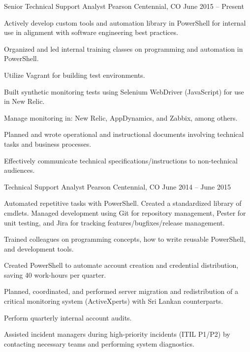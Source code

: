 \cventry
	{Senior Technical Support Analyst} %
	{Pearson} %
	{Centennial, CO} %
	{June 2015 – Present} %
	{
	  	\begin{cvitems} %
	        \item {Actively develop custom tools and automation library in PowerShell for internal use in alignment with software engineering best practices.}
			\item {Organized and led internal training classes on programming and automation in PowerShell.}
			\item {Utilize Vagrant for building test environments.}
			\item {Built synthetic monitoring tests using Selenium WebDriver (JavaScript) for use in New Relic.}
			\item {Manage monitoring in: New Relic, AppDynamics, and Zabbix, among others.}
			\item {Planned and wrote operational and instructional documents involving technical tasks and business processes.}
			\item {Effectively communicate technical specifications/instructions to non-technical audiences.}
		\end{cvitems}
	}

\cventry
	{Technical Support Analyst} %
	{Pearson} %
	{Centennial, CO} %
	{June 2014 – June 2015} %
	{
	  	\begin{cvitems} %
	        \item {Automated repetitive tasks with PowerShell. Created a standardized library of cmdlets. Managed development using Git for repository management, Pester for unit testing, and Jira for tracking features/bugfixes/release management.}
			\item {Trained colleagues on programming concepts, how to write reusable PowerShell, and development tools.}
			\item {Created PowerShell to automate account creation and credential distribution, saving 40 work-hours per quarter.}
			\item {Planned, coordinated, and performed server migration and redistribution of a critical monitoring system (ActiveXperts) with Sri Lankan counterparts.}
			\item {Perform quarterly internal account audits.}
			\item {Assisted incident managers during high-priority incidents (ITIL P1/P2) by contacting necessary teams and performing system diagnostics.}
		\end{cvitems}
	}

